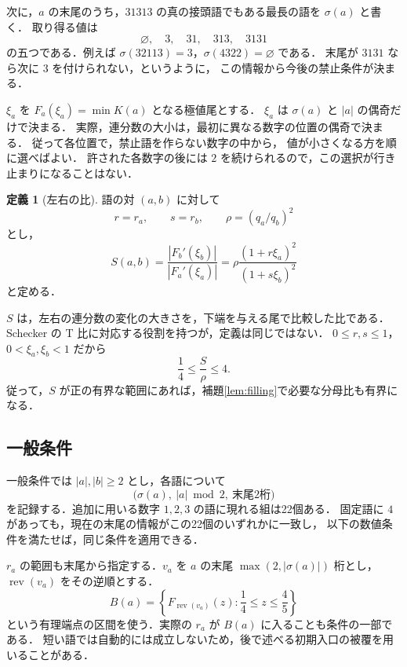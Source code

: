 \documentclass[11pt,a4paper]{article}
\theoremstyle{definition}
\newtheorem{definition}{定義}
\newcommand{\eps}{\varnothing}
\begin{document}
次に，$a$ の末尾のうち，$31313$ の真の接頭語でもある最長の語を $\sigma(a)$ と書く．
取り得る値は
\[
 \eps,\quad 3,\quad 31,\quad 313,\quad 3131
\]
の五つである．例えば $\sigma(32113)=3$，$\sigma(4322)=\eps$ である．
末尾が $3131$ なら次に $3$ を付けられない，というように，
この情報から今後の禁止条件が決まる．

$\xi_a$ を $F_a(\xi_a)=\min K(a)$ となる極値尾とする．
$\xi_a$ は $\sigma(a)$ と $|a|$ の偶奇だけで決まる．
実際，連分数の大小は，最初に異なる数字の位置の偶奇で決まる．
従って各位置で，禁止語を作らない数字の中から，
値が小さくなる方を順に選べばよい．
許された各数字の後には $2$ を続けられるので，この選択が行き止まりになることはない．

\begin{definition}[左右の比]\label{def:ratio}
語の対 $(a,b)$ に対して
\[
 r=r_a,\qquad s=r_b,\qquad \rho=(q_a/q_b)^2
\]
とし，
\begin{equation}\label{eq:S}
 S(a,b)=\frac{|F_b'(\xi_b)|}{|F_a'(\xi_a)|}
       =\rho\frac{(1+r\xi_a)^2}{(1+s\xi_b)^2}
\end{equation}
と定める．
\end{definition}
$S$ は，左右の連分数の変化の大きさを，下端を与える尾で比較した比である．
Schecker の T 比に対応する役割を持つが，定義は同じではない．
$0\le r,s\le1$，$0<\xi_a,\xi_b<1$ だから
\begin{equation}\label{eq:denominator-bounds}
 \frac14\le \frac{S}{\rho}\le4.
\end{equation}
従って，$S$ が正の有界な範囲にあれば，補題\ref{lem:filling}で必要な分母比も有界になる．

\subsection{一般条件}
一般条件では $|a|,|b|\ge2$ とし，各語について
\[
 \bigl(\sigma(a),\ |a|\bmod2,\ \text{末尾2桁}\bigr)
\]
を記録する．追加に用いる数字 $1,2,3$ の語に現れる組は22個ある．
固定語に $4$ があっても，現在の末尾の情報がこの22個のいずれかに一致し，
以下の数値条件を満たせば，同じ条件を適用できる．

$r_a$ の範囲も末尾から指定する．$v_a$ を $a$ の末尾
$\max(2,|\sigma(a)|)$ 桁とし，$\operatorname{rev}(v_a)$ をその逆順とする．
\begin{equation}\label{eq:r-box}
 B(a)=\left\{F_{\operatorname{rev}(v_a)}(z):\frac14\le z\le\frac45\right\}
\end{equation}
という有理端点の区間を使う．実際の $r_a$ が $B(a)$ に入ることも条件の一部である．
短い語では自動的には成立しないため，後で述べる初期入口の被覆を用いることがある．
\end{document}

